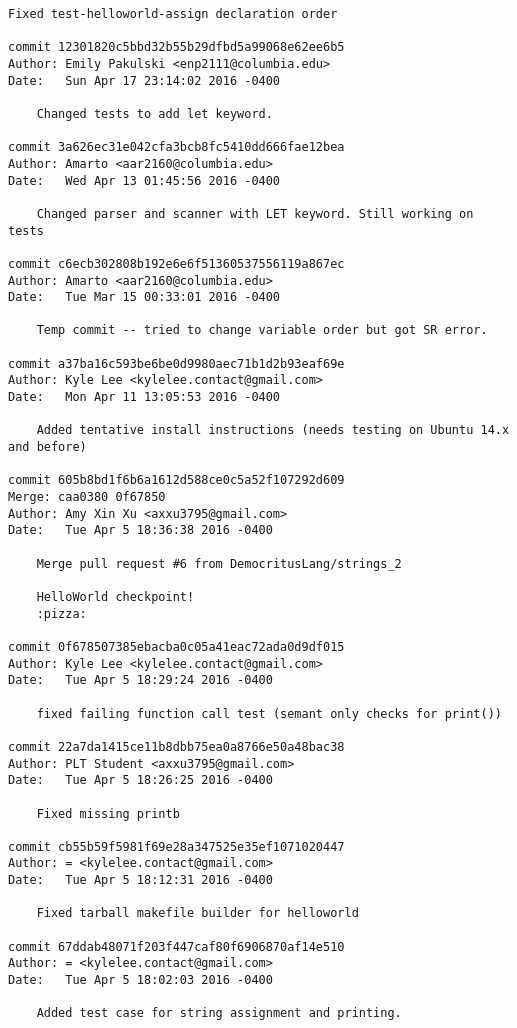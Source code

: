 \begin{lstlisting}[backgroundcolor=\color{white}]
    Fixed test-helloworld-assign declaration order

commit 12301820c5bbd32b55b29dfbd5a99068e62ee6b5
Author: Emily Pakulski <enp2111@columbia.edu>
Date:   Sun Apr 17 23:14:02 2016 -0400

    Changed tests to add let keyword.

commit 3a626ec31e042cfa3bcb8fc5410dd666fae12bea
Author: Amarto <aar2160@columbia.edu>
Date:   Wed Apr 13 01:45:56 2016 -0400

    Changed parser and scanner with LET keyword. Still working on tests

commit c6ecb302808b192e6e6f51360537556119a867ec
Author: Amarto <aar2160@columbia.edu>
Date:   Tue Mar 15 00:33:01 2016 -0400

    Temp commit -- tried to change variable order but got SR error.

commit a37ba16c593be6be0d9980aec71b1d2b93eaf69e
Author: Kyle Lee <kylelee.contact@gmail.com>
Date:   Mon Apr 11 13:05:53 2016 -0400

    Added tentative install instructions (needs testing on Ubuntu 14.x and before)

commit 605b8bd1f6b6a1612d588ce0c5a52f107292d609
Merge: caa0380 0f67850
Author: Amy Xin Xu <axxu3795@gmail.com>
Date:   Tue Apr 5 18:36:38 2016 -0400

    Merge pull request #6 from DemocritusLang/strings_2
    
    HelloWorld checkpoint!
    :pizza:

commit 0f678507385ebacba0c05a41eac72ada0d9df015
Author: Kyle Lee <kylelee.contact@gmail.com>
Date:   Tue Apr 5 18:29:24 2016 -0400

    fixed failing function call test (semant only checks for print())

commit 22a7da1415ce11b8dbb75ea0a8766e50a48bac38
Author: PLT Student <axxu3795@gmail.com>
Date:   Tue Apr 5 18:26:25 2016 -0400

    Fixed missing printb

commit cb55b59f5981f69e28a347525e35ef1071020447
Author: = <kylelee.contact@gmail.com>
Date:   Tue Apr 5 18:12:31 2016 -0400

    Fixed tarball makefile builder for helloworld

commit 67ddab48071f203f447caf80f6906870af14e510
Author: = <kylelee.contact@gmail.com>
Date:   Tue Apr 5 18:02:03 2016 -0400

    Added test case for string assignment and printing.


\end{lstlisting}
